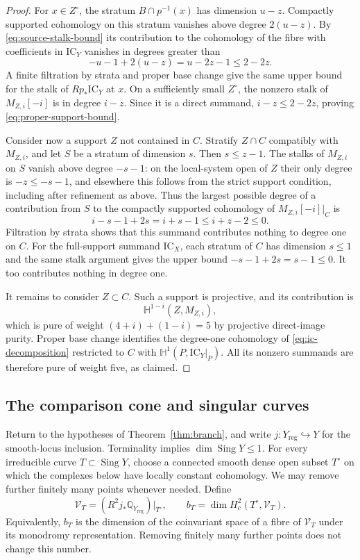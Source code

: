 \begin{proof}
For $x\in Z^\circ$, the stratum $B\cap p^{-1}(x)$ has dimension
$u-z$.  Compactly supported cohomology on this stratum vanishes
above degree $2(u-z)$.  By \eqref{eq:source-stalk-bound} its
contribution to the cohomology of the fibre with coefficients in
$\mathrm{IC}_Y$ vanishes in degrees greater than
\[
 -u-1+2(u-z)=u-2z-1\leq2-2z.
\]
A finite filtration by strata and proper base change give the
same upper bound for the stalk of $Rp_*\mathrm{IC}_Y$ at $x$.
On a sufficiently small $Z^\circ$, the nonzero stalk of
$M_{Z,i}[-i]$ is in degree $i-z$.  Since it is a direct summand,
$i-z\leq2-2z$, proving \eqref{eq:proper-support-bound}.

Consider now a support $Z$ not contained in $C$.  Stratify $Z\cap C$
compatibly with $M_{Z,i}$, and let $S$ be a stratum of dimension
$s$.  Then $s\leq z-1$.  The stalks of $M_{Z,i}$ on $S$ vanish
above degree $-s-1$: on the local-system open of $Z$ their only
degree is $-z\leq-s-1$, and elsewhere this follows from the
strict support condition, including after refinement as above.
Thus the largest possible degree of a contribution from $S$ to
the compactly supported cohomology of $M_{Z,i}[-i]|_C$ is
\[
 i-s-1+2s=i+s-1\leq i+z-2\leq0.
\]
Filtration by strata shows that this summand contributes nothing
to degree one on $C$.  For the full-support summand
$\mathrm{IC}_X$, each stratum of $C$ has dimension $s\leq1$ and
the same stalk argument gives the upper bound
$-s-1+2s=s-1\leq0$.  It too contributes nothing in degree one.

It remains to consider $Z\subset C$.  Such a support is projective,
and its contribution is
\[
 \mathbb H^{1-i}(Z,M_{Z,i}),
\]
which is pure of weight $(4+i)+(1-i)=5$ by projective direct-image
purity.  Proper base change identifies the degree-one cohomology
of \eqref{eq:ic-decomposition} restricted to $C$ with
$\mathbb H^1(P,\mathrm{IC}_Y|_P)$.  All its nonzero summands are
therefore pure of weight five, as claimed.
\end{proof}

\subsection{The comparison cone and singular curves}

Return to the hypotheses of Theorem~\ref{thm:branch}, and write
$j\colon Y_{\mathrm{reg}}\hookrightarrow Y$ for the smooth-locus
inclusion.  Terminality implies
$\dim\operatorname{Sing}Y\leq1$.  For every irreducible curve
$T\subset\operatorname{Sing}Y$, choose a connected smooth dense
open subset $T^\circ$ on which the complexes below have locally
constant cohomology.  We may remove further finitely many points
whenever needed.  Define
\begin{equation}\label{eq:curve-local-system}
 \mathcal V_T=(R^2j_*\mathbb Q_{Y_{\mathrm{reg}}})|_{T^\circ},
 \qquad
 b_T=\dim H_c^2(T^\circ,\mathcal V_T).
\end{equation}
Equivalently, $b_T$ is the dimension of the coinvariant space of
a fibre of $\mathcal V_T$ under its monodromy representation.
Removing finitely many further points does not change this number.

